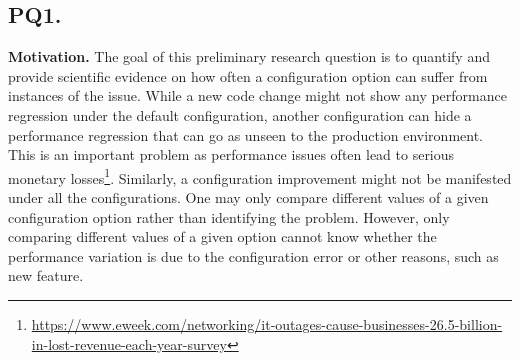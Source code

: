 \subsection*{\textbf{PQ1. \PQI}}
\label{sec:rq1}
\noindent \textbf{Motivation.}
The goal of this preliminary research question is to quantify and provide scientific evidence on how often a configuration option can suffer from instances of the \inconsistent issue. %
While a new code change might not show any performance regression under the default configuration, another configuration can hide a performance regression that can go as unseen to the production environment. This is an important problem as performance issues often lead to serious monetary losses\footnote{\url{https://www.eweek.com/networking/it-outages-cause-businesses-26.5-billion-in-lost-revenue-each-year-survey}}. Similarly, a configuration improvement might not be manifested under all the configurations. 
One may only compare different values of a given configuration option rather than identifying the \inconsistent problem. However, only comparing different values of a given option cannot know whether the performance variation is due to the configuration error or other reasons, such as new feature. %

